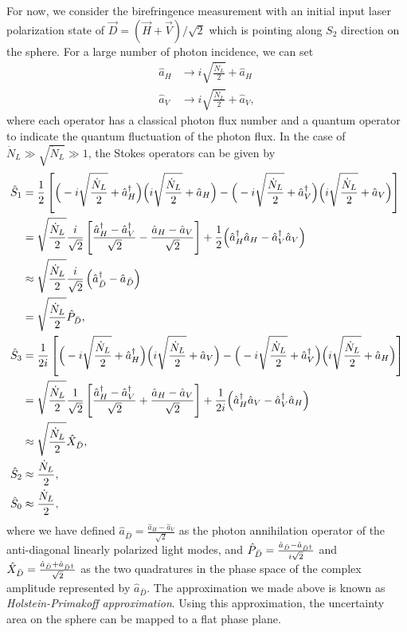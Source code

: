 For now, we consider the birefringence measurement with an initial input laser polarization state of $ \vec{D}=\left( \vec{H}+\vec{V}\right)/\sqrt{2} $ which is pointing along $ S_2 $ direction on the \Poincare sphere. For a large number of photon incidence, we can set 
\begin{subequations}\label{eqs:cohaHV}
\begin{align}
\hat{a}_H &\rightarrow i\sqrt{\frac{\dot{N}_L}{2}} + \hat{a}_H\\
\hat{a}_V &\rightarrow i\sqrt{\frac{\dot{N}_L}{2}} + \hat{a}_V,
\end{align}
\end{subequations}
where each operator has a classical photon flux number and a quantum operator to indicate the quantum fluctuation of the photon flux. In the case of $ \dot{N}_L\gg \sqrt{\dot{N}_L}\gg 1 $, the Stokes operators can be given by
\begin{align}
\hat{S}_1 &= \frac{1}{2}\left[ \Big( -i\sqrt{\frac{\dot{N}_L}{2}} + \hat{a}_H^\dagger \Big) \Big( i\sqrt{\frac{\dot{N}_L}{2}} + \hat{a}_H\Big) -  \Big( -i\sqrt{\frac{\dot{N}_L}{2}} + \hat{a}_V^\dagger\Big)  \Big(i\sqrt{\frac{\dot{N}_L}{2}} + \hat{a}_V \Big) \right]\\
&= \sqrt{\frac{\dot{N}_L}{2}} \frac{i}{\sqrt{2}} \left[\frac{\hat{a}_H^\dagger-\hat{a}_V^\dagger}{\sqrt{2}} - \frac{\hat{a}_H-\hat{a}_V}{\sqrt{2}} \right] + \frac{1}{2} \Big( \hat{a}_H^\dagger \hat{a}_H -  \hat{a}_V^\dagger \hat{a}_V \Big)\\
&\approx \sqrt{\frac{\dot{N}_L}{2}} \frac{i}{\sqrt{2}} \left( \hat{a}_{\bar{D}}^\dagger-\hat{a}_{\bar{D}}\right)\\
&= \sqrt{\frac{\dot{N}_L}{2}} \hat{P}_{\bar{D}},\\
\hat{S}_3 &= \frac{1}{2i} \left[ \Big( -i\sqrt{\frac{\dot{N}_L}{2}} + \hat{a}_H^\dagger \Big) \Big(i\sqrt{\frac{\dot{N}_L}{2}} + \hat{a}_V \Big) -  \Big( -i\sqrt{\frac{\dot{N}_L}{2}} + \hat{a}_V^\dagger\Big) \Big( i\sqrt{\frac{\dot{N}_L}{2}} + \hat{a}_H\Big) \right]\\
&= \sqrt{\frac{\dot{N}_L}{2}}  \frac{1}{\sqrt{2}}\left[ \frac{\hat{a}_H^\dagger-\hat{a}_V^\dagger}{\sqrt{2}} + \frac{\hat{a}_H-\hat{a}_V}{\sqrt{2}} \right] +\frac{1}{2i} \Big( \hat{a}_H^\dagger \hat{a}_V -  \hat{a}_V^\dagger \hat{a}_H \Big)\\
&\approx \sqrt{\frac{\dot{N}_L}{2}} \hat{X}_{\bar{D}},\\
\hat{S}_2 &\approx \frac{\dot{N}_L}{2},\\
\hat{S}_0 &\approx \frac{\dot{N}_L}{2},
\end{align}
where we have defined $ \hat{a}_{\bar{D}} = \frac{\hat{a}_H -\hat{a}_V}{\sqrt{2}} $ as the photon annihilation operator of the anti-diagonal linearly polarized light modes, and $ \hat{P}_{\bar{D}}=\frac{\hat{a}_{\bar{D}}-\hat{a}_{\bar{D}^\dagger}}{i\sqrt{2}} $ and $ \hat{X}_{\bar{D}}=\frac{\hat{a}_{\bar{D}}+\hat{a}_{\bar{D}^\dagger}}{\sqrt{2}} $ as the two quadratures in the phase space of the complex amplitude represented by $ \hat{a}_{\bar{D}} $. The approximation we made above is known as \emph{Holstein-Primakoff approximation}. Using this approximation, the uncertainty area on the \Poincare sphere can be mapped to a flat phase plane. 


